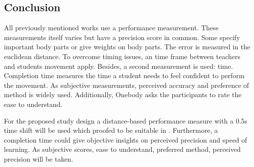 \subsection{Conclusion}
All previously mentioned works use a performance measurement. These measurements itself varies but have a precision score in common. Some \cite{Anderson2013a}\cite{Chan2010}\cite{Tang2015}\cite{Sodhi2012} specify important body parts or give weights on body parts. The error is measured in the euclidean distance. To overcome timing issues, an time frame between teachers and students movement apply. Besides, a second measurement is used: time. Completion time measures the time a student needs to feel confident to perform the movement. As subjective measurements, perceived accuracy and preference of method is widely used. Additionally, Onebody asks the participants to rate the ease to understand. 
\begin{tcolorbox}[colback=red!30!white]
	For the proposed study design a distance-based performance measure with a 0.5s time shift will be used which proofed to be suitable in \cite{Anderson2013a}. Furthermore, a completion time could give objective insights on perceived precision and speed of learning\cite{Anderson2013a}. As subjective scores, ease to understand, preferred method, perceived precision will be taken\cite{Hoang2016}.
\end{tcolorbox}

\newpage
